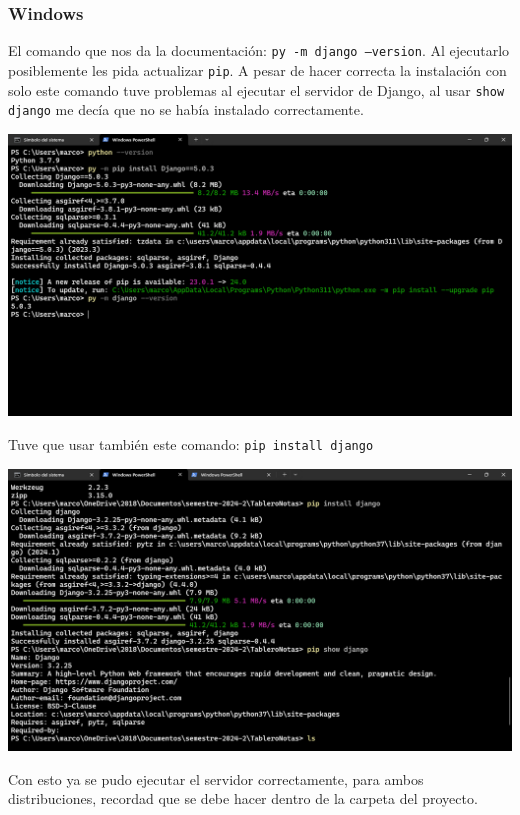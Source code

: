 \subsubsection*{Windows}

El comando que nos da la documentación: \texttt{py -m django --version}. Al ejecutarlo posiblemente les pida actualizar \texttt{pip}. A pesar de hacer correcta la instalación con solo este comando tuve problemas al ejecutar el servidor de Django, al usar \texttt{show django} me decía que no se había instalado correctamente.

\begin{center}
    \includegraphics[scale = .35]{IMA/djangoWindo01.png}
\end{center}


Tuve que usar también este comando: \texttt{pip install django}

\begin{center}
    \includegraphics[scale = .47]{IMA/djangoWindo02.png}
\end{center}

Con esto ya se pudo ejecutar el servidor correctamente, para ambos distribuciones, recordad que se debe hacer dentro de la carpeta del proyecto.


